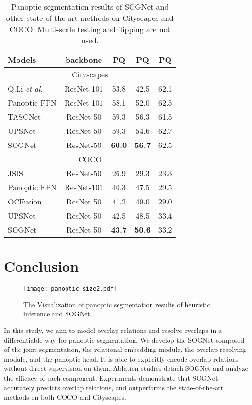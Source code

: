\documentclass[letterpaper]{article} \usepackage{aaai20}  \usepackage{times}  \usepackage{helvet} \usepackage{courier}  \usepackage[hyphens]{url}  \usepackage{graphicx} \urlstyle{rm} \def\UrlFont{\rm}  \usepackage{graphicx}  \frenchspacing  \setlength{\pdfpagewidth}{8.5in}  \setlength{\pdfpageheight}{11in}
\begin{document}
\begin{table}[!t]
	\renewcommand\arraystretch{1.2}
	\centering
\begin{tabular}{l|c|c c c}
			\hline
			Models & backbone & PQ & PQ & PQ \\
			\hline
			\hline
			\multicolumn{5}{c}{Cityscapes}\\
			\hline
			Q.Li \emph{et al.} & ResNet-101 & 53.8 & 42.5 & 62.1 \\
			Panoptic FPN & ResNet-101 & 58.1 & 52.0 & 62.5 \\ 
			TASCNet & ResNet-50 & 59.3 & 56.3 & 61.5 \\
			UPSNet & ResNet-50 & 59.3 & 54.6 & 62.7 \\
			\hline
			SOGNet & ResNet-50 & \textbf{60.0} & \textbf{56.7} & 62.5 \\
			\hline
			\hline
			\multicolumn{5}{c}{COCO}\\
			\hline
			JSIS & ResNet-50 & 26.9 & 29.3 & 23.3 \\
			Panoptic FPN & ResNet-101 & 40.3 & 47.5 & 29.5\\
			OCFusion & ResNet-50 & 41.2 & 49.0 & 29.0 \\
			UPSNet & ResNet-50 & 42.5 & 48.5 & 33.4\\
			\hline
			SOGNet & ResNet-50 & \textbf{43.7} & \textbf{50.6} & 33.2\\
			\hline
		\end{tabular}
\caption{Panoptic segmentation results of SOGNet and other state-of-the-art methods on Cityscapes and COCO. Multi-scale testing and flipping are not used.} \label{cityandcoco}
\end{table}

\section{Conclusion}

\begin{figure}
	\centering
\texttt{[image: panoptic\_size2.pdf]}
\caption{The Visualization of panoptic segmentation results of heuristic inference and SOGNet.}
	\label{panoptic}
\end{figure}

In this study, we aim to model overlap relations and resolve overlaps in a differentiable way for panoptic segmentation. We develop the SOGNet composed of the joint segmentation, the relational embedding module, the overlap resolving module, and the panoptic head. It is able to explicitly encode overlap relations without direct supervision on them. Ablation studies detach SOGNet and analyze the efficacy of each component. Experiments demonstrate that SOGNet accurately predicts overlap relations, and outperforms the state-of-the-art methods on both COCO and Cityscapes.  
\end{document}
